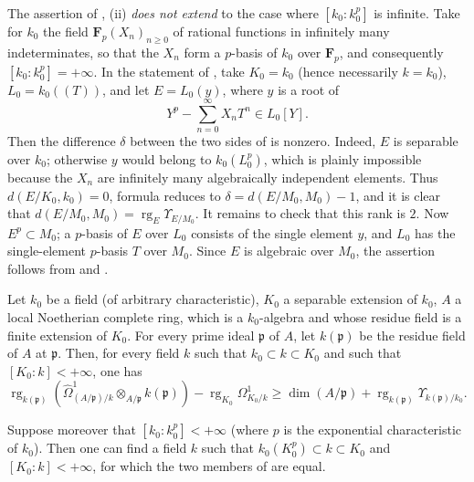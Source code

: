 \begin{remark}[21.9.7]
\label{0.21.9.7}
The assertion of , (ii) \emph{does not extend} to the case where $[k_0:k_0^p]$ is infinite.
Take for $k_0$ the field $\mathbf{F}_p(X_n)_{n\geqslant0}$ of rational functions in infinitely many indeterminates, so that the $X_n$ form a $p$-basis of $k_0$ over $\mathbf{F}_p$, and consequently $[k_0:k_0^p]=+\infty$.
In the statement of , take $K_0=k_0$ (hence necessarily $k=k_0$), $L_0=k_0((T))$, and let $E=L_0(y)$, where $y$ is a root of
\[
  Y^p-\sum_{n=0}^{\infty}X_nT^n\in L_0[Y].
\]
Then the difference $\delta$ between the two sides of  is nonzero.
Indeed, $E$ is separable over $k_0$; otherwise $y$ would belong to $k_0(L_0^p)$, which is plainly impossible because the $X_n$ are infinitely many algebraically independent elements.
Thus $d(E/K_0,k_0)=0$, formula  reduces to $\delta=d(E/M_0,M_0)-1$, and it is clear that $d(E/M_0,M_0)=\operatorname{rg}_E\Upsilon_{E/M_0}$.
It remains to check that this rank is $2$.
Now $E^p\subset M_0$; a $p$-basis of $E$ over $L_0$ consists of the single element $y$, and $L_0$ has the single-element $p$-basis $T$ over $M_0$.
Since $E$ is algebraic over $M_0$, the assertion follows from  and .
\end{remark}

\begin{proposition}[21.9.8]
\label{0.21.9.8}
Let $k_0$ be a field \textup{(}of arbitrary characteristic\textup{)}, $K_0$ a separable extension of $k_0$, $A$ a local Noetherian complete ring, which is a $k_0$-algebra and whose residue field is a finite extension of $K_0$.
For every prime ideal $\mathfrak{p}$ of $A$, let $k(\mathfrak{p})$ be the residue field of $A$ at $\mathfrak{p}$.
Then, for every field $k$ such that $k_0\subset k\subset K_0$ and such that $[K_0:k]<+\infty$, one has
\begin{equation}
\tag{21.9.8.1}
  \label{0.21.9.8.1}
  \operatorname{rg}_{k(\mathfrak{p})}(\widehat{\Omega}^1_{(A/\mathfrak{p})/k}\otimes_{A/\mathfrak{p}} k(\mathfrak{p}))-\operatorname{rg}_{K_0}\Omega^1_{K_0/k}\geqslant\dim(A/\mathfrak{p})+\operatorname{rg}_{k(\mathfrak{p})}\Upsilon_{k(\mathfrak{p})/k_0}.
\end{equation}

Suppose moreover that $[k_0:k_0^p]<+\infty$ \textup{(}where $p$ is the exponential characteristic of $k_0$\textup{)}.
Then one can find a field $k$ such that $k_0(K_0^p)\subset k\subset K_0$ and $[K_0:k]<+\infty$, for which the two members of  are equal.
\end{proposition}

